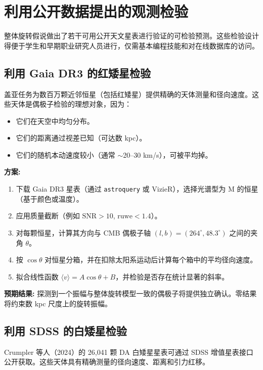 \documentclass[11pt,a4paper]{article}
\begin{document}
	\section{利用公开数据提出的观测检验}
	
	整体旋转假说做出了若干可用公开天文星表进行验证的可检验预测。这些检验设计得便于学生和早期职业研究人员进行，仅需基本编程技能和对在线数据库的访问。
	
	\subsection{利用 Gaia DR3 的红矮星检验}
	
	盖亚任务为数百万颗近邻恒星（包括红矮星）提供精确的天体测量和径向速度。这些天体是偶极子检验的理想对象，因为：
	\begin{itemize}
		\item 它们在天空中均匀分布。
		\item 它们的距离通过视差已知（可达数 kpc）。
		\item 它们的随机本动速度较小（通常 \(\sim\)20–30 km/s），可被平均掉。
	\end{itemize}
	
	\textbf{方案:}
	\begin{enumerate}
		\item 下载 Gaia DR3 星表（通过 \texttt{astroquery} 或 VizieR），选择光谱型为 M 的恒星（基于颜色或温度）。
		\item 应用质量截断（例如 \(\mathrm{SNR} > 10\), \(\mathrm{ruwe} < 1.4\)）。
		\item 对每颗恒星，计算其方向与 CMB 偶极子轴 \((l,b) = (264^\circ, 48.3^\circ)\) 之间的夹角 \(\theta\)。
		\item 按 \(\cos\theta\) 对恒星分箱，并在扣除太阳系运动后计算每个箱中的平均径向速度。
		\item 拟合线性函数 \(\langle v \rangle = A \cos\theta + B\)，并检验是否存在统计显著的斜率。
	\end{enumerate}
	
	\textbf{预期结果:} 探测到一个振幅与整体旋转模型一致的偶极子将提供独立确认。零结果将约束数 kpc 尺度上的旋转振幅。
	
	\subsection{利用 SDSS 的白矮星检验}
	
	Crumpler 等人（2024）的 26,041 颗 DA 白矮星星表可通过 SDSS 增值星表接口公开获取。这些天体具有精确测量的径向速度、距离和引力红移。
	
\end{document}
